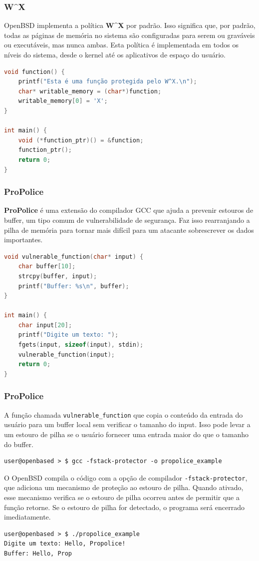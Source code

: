 \documentclass[9pt,xcolor=table]{beamer}
\begin{document}
\begin{frame}[fragile]
\frametitle{W\^{}X}
\justifying
OpenBSD implementa a política \textbf{W\^{}X} por padrão. Isso significa que, por padrão, todas as páginas de memória no sistema são configuradas para serem ou graváveis ou executáveis, mas nunca ambas. Esta política é implementada em todos os níveis do sistema, desde o kernel até os aplicativos de espaço do usuário.
\vspace{0.5cm }
\begin{lstlisting}[language=C]
void function() {
    printf("Esta é uma função protegida pelo W^X.\n");
    char* writable_memory = (char*)function;
    writable_memory[0] = 'X';
}

int main() {
    void (*function_ptr)() = &function;
    function_ptr();
    return 0;
}
\end{lstlisting}

\end{frame}
\begin{frame}[fragile]
\frametitle{ProPolice}
\justifying
\textbf{ProPolice} é uma extensão do compilador GCC que ajuda a prevenir estouros de buffer, um tipo comum de vulnerabilidade de segurança. Faz isso rearranjando a pilha de memória para tornar mais difícil para um atacante sobrescrever os dados importantes.
\vspace{0.5cm}
\begin{lstlisting}[language=C]
void vulnerable_function(char* input) {
    char buffer[10];
    strcpy(buffer, input);
    printf("Buffer: %s\n", buffer);
}

int main() {
    char input[20];
    printf("Digite um texto: ");
    fgets(input, sizeof(input), stdin);
    vulnerable_function(input);
    return 0;
}
\end{lstlisting}
\end{frame}
\begin{frame}[fragile]
\frametitle{ProPolice}
\justifying
A função chamada \verb|vulnerable_function| que copia o conteúdo da entrada do usuário para um buffer local sem verificar o tamanho do input. Isso pode levar a um estouro de pilha se o usuário fornecer uma entrada maior do que o tamanho do buffer.
\begin{lstlisting}
user@openbased > $ gcc -fstack-protector -o propolice_example
\end{lstlisting}
O OpenBSD compila o código com a opção de compilador \verb|-fstack-protector|, que adiciona um mecanismo de proteção ao estouro de pilha. Quando ativado, esse mecanismo verifica se o estouro de pilha ocorreu antes de permitir que a função retorne. Se o estouro de pilha for detectado, o programa será encerrado imediatamente.
\begin{lstlisting}
user@openbased > $ ./propolice_example
Digite um texto: Hello, Propolice!
Buffer: Hello, Prop
\end{lstlisting}
\end{frame}
\end{document}
